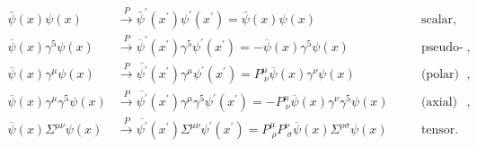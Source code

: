 \begin{equation}
    \begin{aligned}
        \bar{\psi}(x)\psi(x)                           & \xrightarrow{P} \bar{\psi}^{\prime} (x^{\prime}) \psi^{\prime} (x^{\prime}) = \bar{\psi}(x)\psi(x) \quad                                                                                  &  & \text{scalar},         \\
        \overline{\psi}(x) \gamma^5 \psi(x)            & \xrightarrow{P} \overline{\psi}^{\prime}(x^{\prime}) \gamma^5 \psi^{\prime}(x^{\prime}) = - \overline{\psi}(x) \gamma^5 \psi(x) \quad                                                     &  & \text{pseudo-scalar},  \\
        \overline{\psi}(x) \gamma^\mu \psi(x)          & \xrightarrow{P} \overline{\psi^{\prime}}(x^{\prime}) \gamma^\mu \psi^{\prime}(x^{\prime}) = P^{\mu}_{\ \nu} \overline{\psi}(x) \gamma^\nu \psi(x) \quad                                   &  & \text{(polar) vector}, \\
        \overline{\psi}(x) \gamma^\mu \gamma^5 \psi(x) & \xrightarrow{P} \overline{\psi^{\prime}}(x^{\prime}) \gamma^\mu \gamma^5 \psi^{\prime}(x^{\prime}) = - P^{\mu}_{\ \nu} \overline{\psi}(x) \gamma^\nu \gamma^5 \psi(x) \quad               &  & \text{(axial) vector}, \\
        \overline{\psi}(x) \Sigma^{\mu\nu} \psi(x)     & \xrightarrow{P} \overline{\psi^{\prime}}(x^{\prime}) \Sigma^{\mu\nu} \psi^{\prime}(x^{\prime}) = P^{\mu}_{\ \rho} P^{\nu}_{\ \sigma} \overline{\psi}(x) \Sigma^{\rho\sigma} \psi(x) \quad &  & \text{tensor}.
    \end{aligned}
    \label{eq:fermionic_bilinears_parity}
\end{equation}

